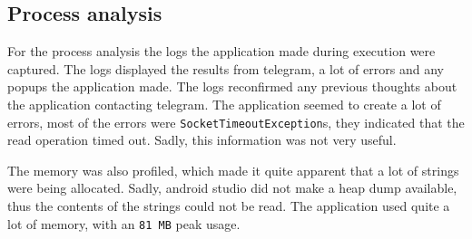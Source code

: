 \subsection{Process analysis}

For the process analysis the logs the application made during execution were captured.
The logs displayed the results from telegram, a lot of errors and any popups the application made.
The logs reconfirmed any previous thoughts about the application contacting telegram.
The application seemed to create a lot of errors, most of the errors were \texttt{SocketTimeoutException}s, they indicated that the read operation timed out.
Sadly, this information was not very useful.

The memory was also profiled, which made it quite apparent that a lot of strings were being allocated.
Sadly, android studio did not make a heap dump available, thus the contents of the strings could not be read.
The application used quite a lot of memory, with an \texttt{81 MB} peak usage.